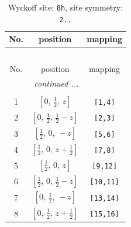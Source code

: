 \documentclass[fleqn,8pt]{jsarticle}
\begin{document}
\begin{longtable}{ccc}
\caption{Wyckoff site: {\tt 8h}, site symmetry: {\tt 2..}}
 \\
 \hline \hline
No. & position & mapping \\ \hline \endfirsthead

\multicolumn{2}{l}{\tablename\ \thetable{}} \\
 \hline \hline
No. & position & mapping \\ \hline \endhead

 \hline \hline
\multicolumn{2}{r}{\footnotesize\it continued ...} \\ \endfoot

 \hline \hline
\multicolumn{2}{r}{} \\ \endlastfoot

1 & $\left[ 0,\, \frac{1}{2},\, z \right]$ & {\tt [1,4]} \\ \hline
2 & $\left[ 0,\, \frac{1}{2},\, \frac{1}{2} - z \right]$ & {\tt [2,3]} \\ \hline
3 & $\left[ \frac{1}{2},\, 0,\, - z \right]$ & {\tt [5,6]} \\ \hline
4 & $\left[ \frac{1}{2},\, 0,\, z + \frac{1}{2} \right]$ & {\tt [7,8]} \\ \hline
5 & $\left[ \frac{1}{2},\, 0,\, z \right]$ & {\tt [9,12]} \\ \hline
6 & $\left[ \frac{1}{2},\, 0,\, \frac{1}{2} - z \right]$ & {\tt [10,11]} \\ \hline
7 & $\left[ 0,\, \frac{1}{2},\, - z \right]$ & {\tt [13,14]} \\ \hline
8 & $\left[ 0,\, \frac{1}{2},\, z + \frac{1}{2} \right]$ & {\tt [15,16]} \\
\end{longtable}
\renewcommand{\arraystretch}{1.2}
\end{document}
